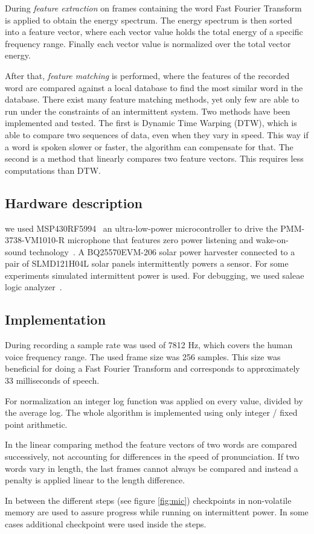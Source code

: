 During \textit{feature extraction} on frames containing the word Fast Fourier Transform is applied to obtain the energy spectrum. 
The energy spectrum is then sorted into a feature vector, where each vector value holds the total energy of a specific frequency range. Finally each vector value is normalized over the total vector energy.

After that, \textit{feature matching} is performed, where the features of the recorded word are compared against a local database to find the most similar word in the database.
There exist many feature matching methods, yet only few are able to run under the constraints of an intermittent system.
Two methods have been implemented and tested. The first is Dynamic Time Warping (DTW), which is able to compare two sequences of data, even when they vary in speed. This way if a word is spoken slower or faster, the algorithm can compensate for that.
The second is a method that linearly compares two feature vectors. This requires less computations than DTW.

\subsection{Hardware description}
we used MSP430RF5994~\cite{} an ultra-low-power microcontroller to drive the PMM-3738-VM1010-R microphone that features zero power listening and wake-on-sound technology~\cite{}. A BQ25570EVM-206 solar power harvester connected to a pair of SLMD121H04L solar panels intermittently powers a \sys sensor. For some experiments simulated intermittent power is used. For debugging, we used saleae logic analyzer~\cite{}. 

\subsection{Implementation}
During recording a sample rate was used of 7812 Hz, which covers the human voice frequency range. The used frame size was 256 samples. This size was beneficial for doing a Fast Fourier Transform and corresponds to approximately 33 milliseconds of speech.

For normalization an integer log function was applied on every value, divided by the average log.
The whole algorithm is implemented using only integer / fixed point arithmetic.

In the linear comparing method the feature vectors of two words are compared successively, not accounting for differences in the speed of pronunciation. If two words vary in length, the last frames cannot always be compared and instead a penalty is applied linear to the length difference.

In between the different steps (see figure \ref{fig:mic}) checkpoints in non-volatile memory are used to assure progress while running on intermittent power. In some cases additional checkpoint were used inside the steps.

